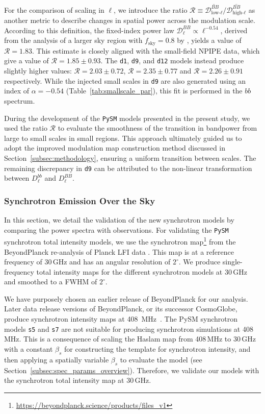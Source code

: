 \documentclass[twocolumn]{aastex631}
\begin{document}
For the comparison of scaling in $\ell$, we introduce the ratio $\mathcal{R} \equiv \overline{\mathcal{D}_{\text{low-}\ell}^{BB}} \Big/ \overline{\mathcal{D}_{\text{high-}\ell}^{BB}}$ as another metric to describe changes in spatial power across the modulation scale. According to this definition, the fixed-index power law $\mathcal{D}_\ell^{BB} \propto \ell^{-0.54}$, derived from the analysis of a larger sky region with $f_\text{sky} = 0.8$ by \cite{planck2016-l11A}, yields a value of $\mathcal{R} = 1.83$. This estimate is closely aligned with the small-field NPIPE data, which give a value of $\mathcal{R} = 1.85 \pm 0.93$. The \texttt{d1}, \texttt{d9}, and \texttt{d12} models instead produce slightly higher values: $\mathcal{R} = 2.03 \pm 0.72$, $\mathcal{R} = 2.35 \pm 0.77$ and $\mathcal{R} = 2.26 \pm 0.91$ respectively. While the injected small scales in \texttt{d9} are also generated using an index of $\alpha = -0.54$ (Table~\ref{tab:smallscale_par}), this fit is performed in the $bb$ spectrum. 

During the development of the \texttt{PySM} models presented in the present study, we used the ratio $\mathcal{R}$ to evaluate the smoothness of the transition in bandpower from large to small scales in small regions. This approach ultimately guided us to adopt the improved modulation map construction method discussed in Section~\ref{subsec:methodology}, ensuring a uniform transition between scales. The remaining discrepancy in \texttt{d9} can be attributed to the non-linear transformation between $D_\ell^{bb}$ and $D_\ell^{BB}$.

\subsubsection{Synchrotron Emission Over the Sky} \label{sec:sync_validation}

In this section, we detail the validation of the new synchrotron models by comparing the power spectra with observations. For validating the \texttt{PySM} synchrotron total intensity models, we use the synchrotron map\footnote{\url{https://beyondplanck.science/products/files\_v1}} from the BeyondPlanck re-analysis of Planck LFI data \citep{Andersen:2023}. This map is at a reference frequency of 30\,GHz and has an angular resolution of $2^\circ$. We produce single-frequency total intensity maps for the different synchrotron models at 30\,GHz and smoothed to a FWHM of $2^\circ$.

We have purposely chosen an earlier release of BeyondPlanck for our analysis. Later data release versions of BeyondPlanck, or its successor CosmoGlobe, produce synchrotron intensity maps at 408~MHz~\citep{Watts:2023b}. The PySM synchrotron models \texttt{s5} and \texttt{s7} are not suitable for producing synchrotron simulations at 408\,MHz. This is a consequence of scaling the Haslam map from 408\,MHz to 30\,GHz with a constant $\beta_s$ for constructing the template for synchrotron intensity, and then applying a spatially variable $\beta_s$ to evaluate the model (see Section~\ref{subsec:spec_params_overview}). Therefore, we validate our models with the synchrotron total intensity map at 30\,GHz.
\end{document}
